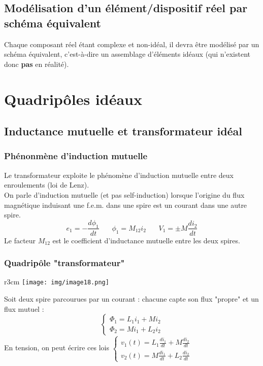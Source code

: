 \documentclass	[11pt, a4paper, openany]{book}
\begin{document}
\section{Modélisation d'un élément/dispositif réel par schéma équivalent}
Chaque composant réel étant complexe et non-idéal, il devra être modélisé par un schéma équivalent, c'est-à-dire un assemblage d'éléments idéaux (qui n'existent donc \textbf{pas} en réalité).


\chapter{Quadripôles idéaux}
\setcounter{section}{2}
\section{Inductance mutuelle et transformateur idéal}
\subsection{Phénonmène d'induction mutuelle}
Le transformateur exploite le phénomène d'induction mutuelle entre deux enroulements (loi de Lenz).\\
On parle d'induction mutuelle (et pas self-induction) lorsque l'origine du flux magnétique induisant une f.e.m. dans une spire est un courant dans une autre spire.
\begin{equation}
e_1 = -\frac{d\phi_1}{dt}\ \ \ \ \ \ \ \ \phi_1 = M_{12}i_2\ \ \ \ \ \ \ \ V_1 = \pm M\frac{di_2}{dt}
\end{equation}
Le facteur $M_{12}$ est le coefficient d'inductance mutuelle entre les deux spires.

\subsection{Quadripôle "transformateur"}
\begin{wrapfigure}[8]{r}{3cm}
\texttt{[image: img/image18.png]}
\end{wrapfigure}
Soit deux spire parcourues par un courant : chacune capte son flux "propre" et un flux mutuel :
\begin{equation}
\left\{\begin{array}{l}
\Phi_1 = L_1i_1 + Mi_2\\
\Phi_2 = Mi_1 + L_2i_2
\end{array}\right.
\end{equation}
En tension, on peut écrire ces lois $\left\{\begin{array}{l}
v_1(t) = L_1\frac{di_1}{dt} + M\frac{di_2}{dt}\\
v_2(t) = M\frac{di_1}{dt} + L_2\frac{di_2}{dt}
\end{array}\right.$
\end{document}
